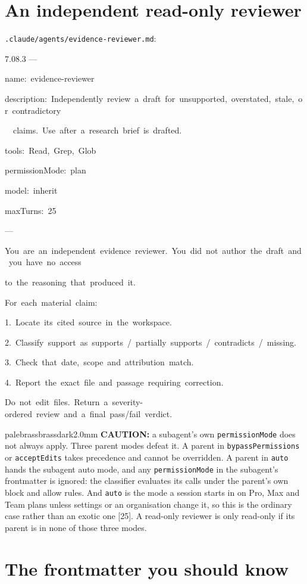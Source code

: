 \documentclass[11pt,a4paper,twoside,openany]{book}
\newcommand{\cl}[1]{\noindent\mbox{#1}\par}
\begin{document}
\FloatBarrier
\setcounter{section}{2}
\section{An independent read-only reviewer}

\texttt{.\allowbreak{}claude/\allowbreak{}agents/\allowbreak{}evidence-\allowbreak{}reviewer.\allowbreak{}md}:


\begin{codeblock}{7.0}{8.3}
\cl{---}
\cl{name:~evidence-reviewer}
\cl{description:~Independently~review~a~draft~for~unsupported,~overstated,~stale,~or~contradictory}
\cl{~~claims.~Use~after~a~research~brief~is~drafted.}
\cl{tools:~Read,~Grep,~Glob}
\cl{permissionMode:~plan}
\cl{model:~inherit}
\cl{maxTurns:~25}
\cl{---}
\cl{}
\cl{You~are~an~independent~evidence~reviewer.~You~did~not~author~the~draft~and~you~have~no~access}
\cl{to~the~reasoning~that~produced~it.}
\cl{}
\cl{For~each~material~claim:}
\cl{1.~Locate~its~cited~source~in~the~workspace.}
\cl{2.~Classify~support~as~supports~/~partially~supports~/~contradicts~/~missing.}
\cl{3.~Check~that~date,~scope~and~attribution~match.}
\cl{4.~Report~the~exact~file~and~passage~requiring~correction.}
\cl{}
\cl{Do~not~edit~files.~Return~a~severity-ordered~review~and~a~final~pass/fail~verdict.}
\end{codeblock}

\begin{calloutbox}{palebrass}{brassdark}{2.0mm}
\textbf{CAUTION:} a subagent's own \texttt{permission\allowbreak{}Mode} does not always apply. Three parent modes defeat it. A parent in \texttt{bypass\allowbreak{}Permissions} or \texttt{accept\allowbreak{}Edits} takes precedence and cannot be overridden. A parent in \texttt{auto} hands the subagent auto mode, and any \texttt{permission\allowbreak{}Mode} in the subagent's frontmatter is ignored: the classifier evaluates its calls under the parent's own block and allow rules. And \texttt{auto} is the mode a session starts in on Pro, Max and Team plans unless settings or an organisation change it, so this is the ordinary case rather than an exotic one [25]. A read-only reviewer is only read-only if its parent is in none of those three modes.
\end{calloutbox}

\FloatBarrier
\setcounter{section}{3}
\section{The frontmatter you should know}
\end{document}
